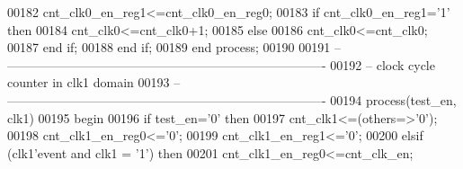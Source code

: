 \begin{DoxyCode}
00182             \textcolor{vhdlchar}{cnt_clk0_en_reg1}\textcolor{vhdlchar}{<=}\textcolor{vhdlchar}{cnt_clk0_en_reg0};
00183           \textcolor{keywordflow}{if} \textcolor{vhdlchar}{cnt_clk0_en_reg1}\textcolor{vhdlchar}{=}\textcolor{vhdlchar}{'}\textcolor{vhdllogic}{}\textcolor{vhdllogic}{1}\textcolor{vhdlchar}{'} \textcolor{keywordflow}{then} 
00184                 \textcolor{vhdlchar}{cnt_clk0}\textcolor{vhdlchar}{<=}\textcolor{vhdlchar}{cnt_clk0}\textcolor{vhdlchar}{+}\textcolor{vhdllogic}{}\textcolor{vhdllogic}{1};
00185             \textcolor{keywordflow}{else} 
00186                 \textcolor{vhdlchar}{cnt_clk0}\textcolor{vhdlchar}{<=}\textcolor{vhdlchar}{cnt_clk0};
00187             \textcolor{keywordflow}{end} \textcolor{keywordflow}{if};
00188         \textcolor{keywordflow}{end} \textcolor{keywordflow}{if};
00189     \textcolor{keywordflow}{end} \textcolor{keywordflow}{process};
00190      
00191 \textcolor{keyword}{-- ----------------------------------------------------------------------------}
00192 \textcolor{keyword}{-- clock cycle counter in clk1 domain}
00193 \textcolor{keyword}{-- ----------------------------------------------------------------------------}
00194   \textcolor{keywordflow}{process}(test_en, clk1)
00195 \textcolor{vhdlkeyword}{    begin}
00196       \textcolor{keywordflow}{if} \textcolor{vhdlchar}{test_en}\textcolor{vhdlchar}{=}\textcolor{vhdlchar}{'}\textcolor{vhdllogic}{}\textcolor{vhdllogic}{0}\textcolor{vhdlchar}{'} \textcolor{keywordflow}{then}
00197             \textcolor{vhdlchar}{cnt_clk1}\textcolor{vhdlchar}{<=}\textcolor{vhdlchar}{(}\textcolor{keywordflow}{others}\textcolor{vhdlchar}{=}\textcolor{vhdlchar}{>}\textcolor{vhdlchar}{'}\textcolor{vhdllogic}{}\textcolor{vhdllogic}{0}\textcolor{vhdlchar}{'}\textcolor{vhdlchar}{)};
00198             \textcolor{vhdlchar}{cnt_clk1_en_reg0}\textcolor{vhdlchar}{<=}\textcolor{vhdlchar}{'}\textcolor{vhdllogic}{}\textcolor{vhdllogic}{0}\textcolor{vhdlchar}{'};
00199             \textcolor{vhdlchar}{cnt_clk1_en_reg1}\textcolor{vhdlchar}{<=}\textcolor{vhdlchar}{'}\textcolor{vhdllogic}{}\textcolor{vhdllogic}{0}\textcolor{vhdlchar}{'};        
00200         \textcolor{keywordflow}{elsif} \textcolor{vhdlchar}{(}\textcolor{vhdlchar}{clk1}\textcolor{vhdlchar}{'}\textcolor{vhdlkeyword}{event} \textcolor{keywordflow}{and} \textcolor{vhdlchar}{clk1} \textcolor{vhdlchar}{=} \textcolor{vhdlchar}{'}\textcolor{vhdllogic}{}\textcolor{vhdllogic}{1}\textcolor{vhdlchar}{'}\textcolor{vhdlchar}{)} \textcolor{keywordflow}{then}
00201             \textcolor{vhdlchar}{cnt_clk1_en_reg0}\textcolor{vhdlchar}{<=}\textcolor{vhdlchar}{cnt_clk_en};

\end{DoxyCode}
